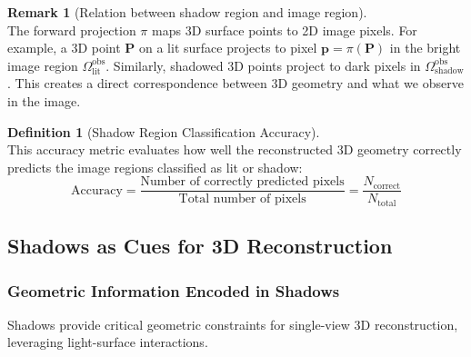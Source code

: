 \documentclass[12pt]{article}
\newcommand{\vect}[1]{\bm{#1}}
\theoremstyle{definition}
\newtheorem{definition}{Definition}[subsection]
\newtheorem{remark}{Remark}[subsection]
\begin{document}
\begin{remark}[Relation between shadow region and image region] \label{rmk:shadow_projection} ~\\
The forward projection $\pi$ maps 3D surface points to 2D image pixels. For example, a 3D point $\vect{P}$ on a lit surface projects to pixel $\vect{p} = \pi(\vect{P})$ in the bright image region $\Omega_{\text{lit}}^{\text{obs}}$. Similarly, shadowed 3D points project to dark pixels in $\Omega_{\text{shadow}}^{\text{obs}}$. This creates a direct correspondence between 3D geometry and what we observe in the image.
\end{remark}

\begin{definition}[Shadow Region Classification Accuracy] \label{def:shadow_accuracy} ~\\
This accuracy metric evaluates how well the reconstructed 3D geometry correctly predicts the image regions classified as lit or shadow:
\begin{equation}
\text{Accuracy} = \frac{\text{Number of correctly predicted pixels}}{\text{Total number of pixels}} = \frac{N_{\text{correct}}}{N_{\text{total}}}
\end{equation}
\end{definition}

\subsection{Shadows as Cues for 3D Reconstruction} \label{sec:shadow_cues}

\subsubsection*{Geometric Information Encoded in Shadows} \label{sec:shadow_geom_info}

Shadows provide critical geometric constraints for single-view 3D reconstruction, leveraging light-surface interactions.
\end{document}
